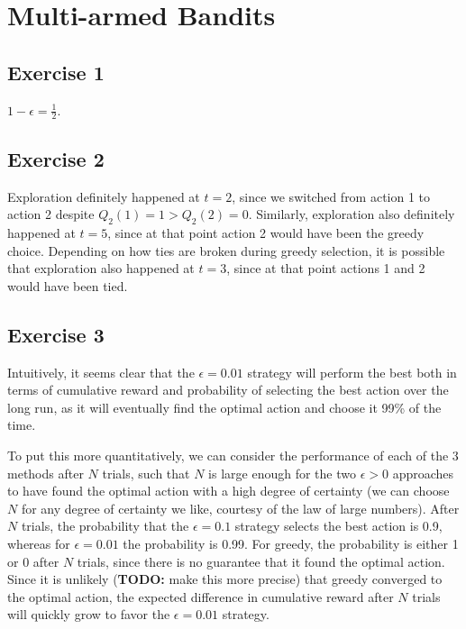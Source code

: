 \section{Multi-armed Bandits}

\subsection{Exercise 1}
$1 - \epsilon = \frac{1}{2}$.

\subsection{Exercise 2}
Exploration definitely happened at $t = 2$, since we switched from action 1 to action 2 despite
$Q_2(1) = 1 > Q_2(2) = 0$. Similarly, exploration also definitely happened at $t = 5$, since at that
point action 2 would have been the greedy choice. Depending on how ties are broken during greedy selection,
it is possible that exploration also happened at  $t = 3$, since at that point actions 1 and 2 would have
been tied.

\subsection{Exercise 3}
Intuitively, it seems clear that the $\epsilon = 0.01$ strategy will perform the best both in terms of
cumulative reward and probability of selecting the best action over the long run, as it will eventually
find the optimal action and choose it 99\% of the time.

To put this more quantitatively, we can consider the performance of each of the 3 methods after $N$ trials,
such that $N$ is large enough for the two $\epsilon > 0$ approaches to have found the optimal action with a
high degree of certainty (we can choose $N$ for any degree of certainty we like, courtesy of the law of
large numbers). After $N$ trials, the probability that the $\epsilon = 0.1$ strategy selects the best action is
0.9, whereas for $\epsilon = 0.01$ the probability is 0.99. For greedy, the probability is either 1 or 0 after
$N$ trials, since there is no guarantee that it found the optimal action. Since it is unlikely (\textbf{TODO:}
make this more precise) that greedy converged to the optimal action, the expected difference in cumulative
reward after $N$ trials will quickly grow to favor the $\epsilon = 0.01$ strategy.
